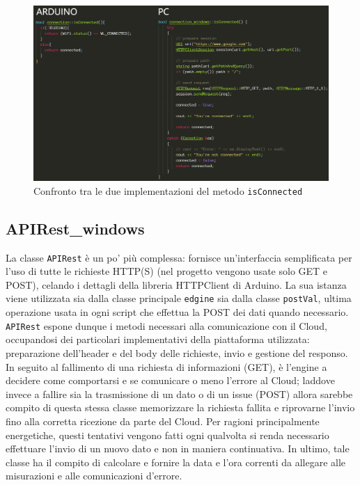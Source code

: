 \begin{figure}[H]
	\centering
	\includegraphics[width=\linewidth]{pics/connAW}
	\caption{Confronto tra le due implementazioni del metodo \texttt{isConnected}}
	\label{connAW}
\end{figure}

\subsection{APIRest\_windows}
La classe \texttt{APIRest} è un po' più complessa: fornisce un'interfaccia semplificata per l'uso di tutte le richieste HTTP(S) (nel progetto vengono usate solo GET e POST), celando i dettagli della libreria HTTPClient di Arduino. La sua istanza viene utilizzata sia dalla classe principale \texttt{edgine} sia dalla classe \texttt{postVal}, ultima operazione usata in ogni script che effettua la POST dei dati quando necessario. \texttt{APIRest} espone dunque i metodi necessari alla comunicazione con il Cloud, occupandosi dei particolari implementativi della piattaforma utilizzata: preparazione dell'header e del body delle richieste, invio e gestione del responso. In seguito al fallimento di una richiesta di informazioni (GET), è l'engine a decidere come comportarsi e se comunicare o meno l'errore al Cloud; laddove invece a fallire sia la trasmissione di un dato o di un issue (POST) allora sarebbe compito di questa stessa classe memorizzare la richiesta fallita e riprovarne l'invio fino alla corretta ricezione da parte del Cloud. Per ragioni principalmente energetiche, questi tentativi vengono fatti ogni qualvolta si renda necessario effettuare l'invio di un nuovo dato e non in maniera continuativa. In ultimo, tale classe ha il compito di calcolare e fornire la data e l'ora correnti da allegare alle misurazioni e alle comunicazioni d'errore.

